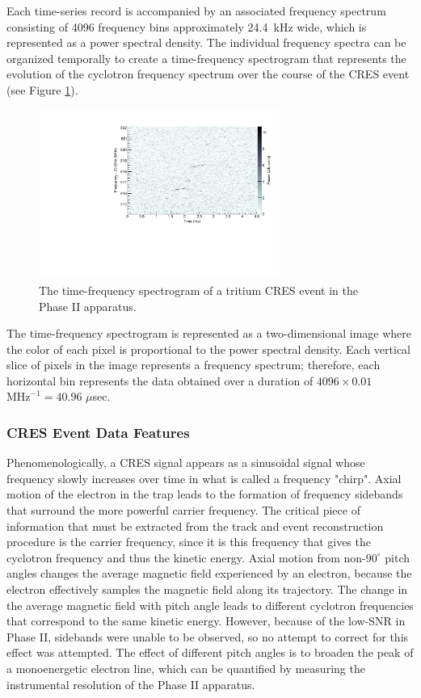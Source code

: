 Each time-series record is accompanied by an associated frequency spectrum consisting of 4096 frequency bins approximately 24.4~kHz wide, which is represented as a power spectral density. The individual frequency spectra can be organized temporally to create a time-frequency spectrogram that represents the evolution of the cyclotron frequency spectrum over the course of the CRES event (see Figure \ref{fig:chap3-tritium-event0-spectrogram}). 
\begin{figure}[htbp]
    \centering
    \includegraphics[width=0.7\textwidth]{figs/Chapter-3/T2_Event0.pdf}
    \caption{The time-frequency spectrogram of a tritium CRES event in the Phase II apparatus.}
    \label{fig:chap3-tritium-event0-spectrogram}
\end{figure}
The time-frequency spectrogram is represented as a two-dimensional image where the color of each pixel is proportional to the power spectral density. Each vertical slice of pixels in the image represents a frequency spectrum; therefore, each horizontal bin represents the data obtained over a duration of $4096\times 0.01$ $\mathrm{MHz}^{-1}=40.96$ $\mu$sec. 

\subsubsection*{CRES Event Data Features}

Phenomenologically, a CRES signal appears as a sinusoidal signal whose frequency slowly increases over time in what is called a frequency "chirp". Axial motion of the electron in the trap leads to the formation of frequency sidebands that surround the more powerful carrier frequency. The critical piece of information that must be extracted from the track and event reconstruction procedure is the carrier frequency, since it is this frequency that gives the cyclotron frequency and thus the kinetic energy. Axial motion from non-$90^\circ$ pitch angles changes the average magnetic field experienced by an electron, because the electron effectively samples the magnetic field along its trajectory. The change in the average magnetic field with pitch angle leads to different cyclotron frequencies that correspond to the same kinetic energy. However, because of the low-SNR in Phase II, sidebands were unable to be observed, so no attempt to correct for this effect was attempted. The effect of different pitch angles is to broaden the peak of a monoenergetic electron line, which can be quantified by measuring the instrumental resolution of the Phase II apparatus.

